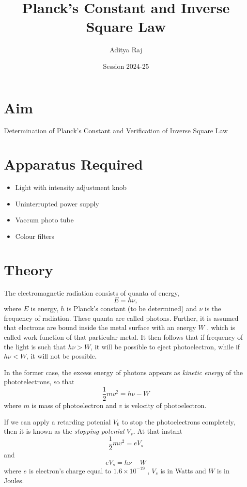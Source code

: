 \documentclass[a4paper,12pt]{article}
\begin{document}
\title{Planck's Constant and Inverse Square Law}
\author{Aditya Raj}
\date{Session 2024-25}
\maketitle

\section{Aim}
Determination of Planck's Constant and Verification of Inverse Square Law

\section{Apparatus Required}
\begin{itemize}
    \item Light with intensity adjustment knob
    \item Uninterrupted power supply
    \item Vaccum photo tube
    \item Colour filters 
\end{itemize}

\section{Theory}
The electromagnetic radiation consists of quanta of energy,
\begin{equation}
    \label{Planck}
    E = h \nu ,
\end{equation}
where \(E\) is energy, \(h\) is Planck's constant (to be determined) and \(\nu\) is the frequency of radiation.
These quanta are called photons. Further, it is assumed that electrons are bound inside the metal surface with an energy \(W\)
, which is called work function of that particular metal. It then follows that if frequency of the light is such that
\(h \nu > W \), it will be possible to eject photoelectron, while if \(h \nu < W \), it will not be possible.

In the former case, the excess energy of photons appears as \emph{kinetic energy} of the phototelectrons, so that
\begin{equation}
    \label{kinetic}
    \frac{1}{2}mv^2 = h \nu - W
\end{equation}
where \(m\) is mass of photoelectron and \(v\) is velocity of photoelectron.

If we can apply a retarding potenial \(V_0\) to stop the photoelectrons completely, then it is known as the \emph{stopping potenial} \(V_s\). At that instant
\begin{equation}
    \label{potenial_kinetic}
    \frac{1}{2}mv^2 = e V_s
\end{equation}
and
\begin{equation}
    \label{potential_workfunction}
    e V_s = h \nu - W
\end{equation}
where \(e\) is electron's charge equal to \(1.6 \times 10^{-19}\) , \(V_s\) is in Watts and \(W\) is in Joules.
\end{document}
